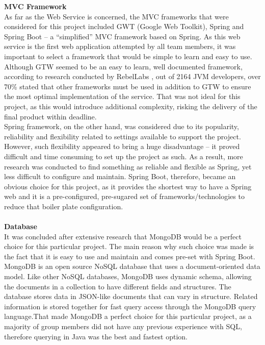 \documentclass[a4paper,11pt]{article}
\begin{document}
\noindent \textbf{MVC Framework}
\\
As far as the Web Service is concerned, the MVC frameworks that were considered for this project included GWT (Google Web Toolkit), Spring and Spring Boot – a “simplified” MVC framework based on Spring. As this web service is the first web application attempted by all team members, it was important to select a framework that would be simple to learn and easy to use.
\\
\indent Although GTW seemed to be an easy to learn, well documented framework, according to research conducted by RebelLabs , out of 2164 JVM developers, over 70\% stated that other frameworks must be used in addition to GTW to ensure the most optimal implementation of the service. That was not ideal for this project, as this would introduce additional complexity, risking the delivery of the final product within deadline.
\\
\indent Spring framework, on the other hand, was considered due to its popularity, reliability and flexibility related to settings available to support the project. However, such flexibility appeared to bring a huge disadvantage – it proved difficult and time consuming to set up the project as such. As a result, more research was conducted to find something as reliable and flexible as Spring, yet less difficult to configure and maintain. Spring Boot, therefore, became an obvious choice for this project, as it provides the shortest way to have a Spring web and it is a pre-configured, pre-sugared set of frameworks/technologies to reduce that boiler plate configuration.
\\\\
\textbf{Database}
\\
It was concluded after extensive research that MongoDB would be a perfect choice for this particular project. The main reason why such choice was made is the fact that it is easy to use and maintain and comes pre-set with Spring Boot. MongoDB is an open source NoSQL database that uses a document-oriented data model. Like other NoSQL databases, MongoDB uses dynamic schema, allowing the documents in a collection to have different fields and structures. The database stores data in JSON-like documents that can vary in structure. Related information is stored together for fast query access through the MongoDB query language.That made MongoDB a perfect choice for this particular project, as a majority of group members did not have any previous experience with SQL, therefore querying in Java was the best and fastest option. 
\end{document}
